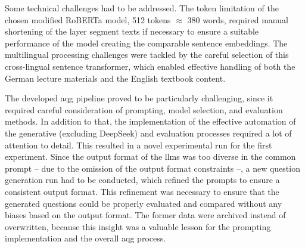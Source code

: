 Some technical challenges had to be addressed. The token limitation of the chosen modified RoBERTa model, 512 tokens $\approx$ 380 words, required manual shortening of the layer segment texts if necessary to ensure a suitable performance of the model creating the comparable sentence embeddings. The multilingual processing challenges were tackled by the careful selection of this cross-lingual sentence transformer, which enabled effective handling of both the German lecture materials and the English textbook content.

\pagebreak

The developed \ac{aqg} pipeline proved to be particularly challenging, since it required careful consideration of prompting, model selection, and evaluation methods. In addition to that, the implementation of the effective automation of the generative (excluding DeepSeek) and evaluation processes required a lot of attention to detail. This resulted in a novel experimental run for the first experiment. Since the output format of the \ac{llms} was too diverse in the common prompt -- due to the omission of the output format constraints --, a new question generation run had to be conducted, which refined the prompts to ensure a consistent output format. This refinement was necessary to ensure that the generated questions could be properly evaluated and compared without any biases based on the output format. The former data were archived instead of overwritten, because this insight was a valuable lesson for the prompting implementation and the overall \ac{aqg} process.